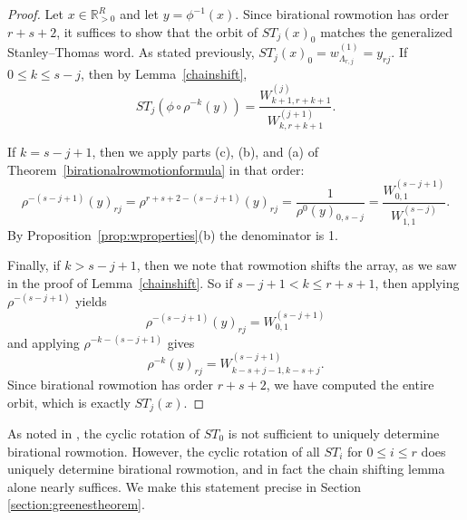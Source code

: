 \documentclass[ALCO,Unicode,published]{cedram}
\numberwithin{equation}{section}
\newcommand{\ST}{ST}
\begin{document}
\begin{proof}
Let $x \in \mathbb{R}_{>0}^R$ and let $y = \phi^{-1}(x)$. Since birational rowmotion has order $r+s+2$, it suffices to show that the orbit of $\ST_j(x)_0$ matches the generalized Stanley--Thomas word. As stated previously, 
$\ST_j(x)_0 = w_{\Lambda_{r,j}}^{(1)} = y_{rj}$.
If $0 \leq k \leq s-j$, then by Lemma~\ref{chainshift},
\[\ST_j( \phi \circ \rho^{-k}(y) ) = \frac{ W_{k+1,r+k+1}^{(j)} }{ W_{k,r+k+1}^{(j+1)} }.\]

If $k = s-j+1$, then we apply parts (c), (b), and (a) of Theorem~\ref{birationalrowmotionformula} in that order:
\[\rho^{-(s-j+1)}(y)_{rj} = \rho^{r+s+2-(s-j+1)}(y)_{rj} = \frac{1}{\rho^{0}(y)_{0,s-j}} = \frac{W_{0,1}^{(s-j+1)}}{W_{1,1}^{(s-j)}}.\]
By Proposition~\ref{prop:wproperties}(b) the denominator is 1.

Finally, if $k>s-j+1$, then we note that rowmotion shifts the array, as we saw in the proof of Lemma~\ref{chainshift}. So if $s-j+1 < k \leq r+s+1$, then applying $\rho^{-(s-j+1)}$ yields
\[\rho^{-(s-j+1)}(y)_{rj} = W_{0,1}^{(s-j+1)}\]
and applying $\rho^{-k-(s-j+1)}$ gives
\[\rho^{-k}(y)_{rj} = W_{k-s+j-1,k-s+j}^{(s-j+1)}.\]
Since birational rowmotion has order $r+s+2$, we have computed the entire orbit, which is exactly $\ST_j(x)$.
\end{proof}


As noted in \cite{josephroby1}, the cyclic rotation of $ST_0$ is not sufficient to uniquely determine birational rowmotion. However, the cyclic rotation of all $ST_i$ for $0 \leq i \leq r$ does uniquely determine birational rowmotion, and in fact the chain shifting lemma alone nearly suffices. We make this statement precise in Section \ref{section:greenestheorem}.
\end{document}
